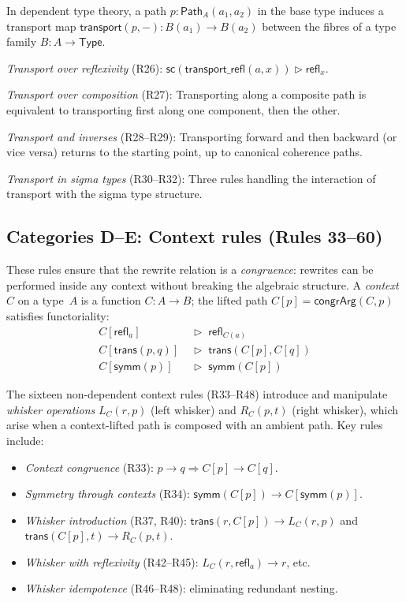 \documentclass[manuscript]{BSLstyle}
\newcommand{\Path}{\mathsf{Path}}
\newcommand{\refl}{\mathsf{refl}}
\newcommand{\symm}{\mathsf{symm}}
\newcommand{\trans}{\mathsf{trans}}
\newcommand{\congrArg}{\mathsf{congrArg}}
\newcommand{\transport}{\mathsf{transport}}
\newcommand{\Type}{\mathsf{Type}}
\begin{document}
In dependent type theory, a path $p : \Path_A(a_1, a_2)$ in the base type
induces a transport map $\transport(p, -) : B(a_1) \to B(a_2)$ between
the fibres of a type family $B : A \to \Type$.

\emph{Transport over reflexivity} (R26):
$\mathsf{sc}(\mathsf{transport\_refl}(a, x)) \triangleright \refl_x$.

\emph{Transport over composition} (R27): Transporting along a composite
path is equivalent to transporting first along one component, then the
other.

\emph{Transport and inverses} (R28--R29): Transporting forward and then
backward (or vice versa) returns to the starting point, up to canonical
coherence paths.

\emph{Transport in sigma types} (R30--R32): Three rules handling the
interaction of transport with the sigma type structure.

\subsection{Categories D--E: Context rules (Rules 33--60)}\label{ssec:cat-DE}

These rules ensure that the rewrite relation is a \emph{congruence}:
rewrites can be performed inside any context without breaking the algebraic
structure.  A \emph{context} $C$ on a type~$A$ is a function $C : A \to B$;
the lifted path $C[p] = \congrArg(C, p)$ satisfies functoriality:
\begin{align}
C[\refl_a] &\;\triangleright\; \refl_{C(a)} \tag{context--refl} \\
C[\trans(p, q)] &\;\triangleright\; \trans(C[p], C[q]) \tag{context--trans} \\
C[\symm(p)] &\;\triangleright\; \symm(C[p]) \tag{context--symm}
\end{align}

The sixteen non-dependent context rules (R33--R48) introduce and
manipulate \emph{whisker operations} $L_C(r, p)$ (left whisker) and
$R_C(p, t)$ (right whisker), which arise when a context-lifted path
is composed with an ambient path.  Key rules include:

\begin{itemize}
\item \emph{Context congruence} (R33): $p \to q \Longrightarrow C[p] \to C[q]$.
\item \emph{Symmetry through contexts} (R34): $\symm(C[p]) \to C[\symm(p)]$.
\item \emph{Whisker introduction} (R37, R40): $\trans(r, C[p]) \to L_C(r, p)$
  and $\trans(C[p], t) \to R_C(p, t)$.
\item \emph{Whisker with reflexivity} (R42--R45): $L_C(r, \refl_a) \to r$, etc.
\item \emph{Whisker idempotence} (R46--R48): eliminating redundant nesting.
\end{itemize}
\end{document}
